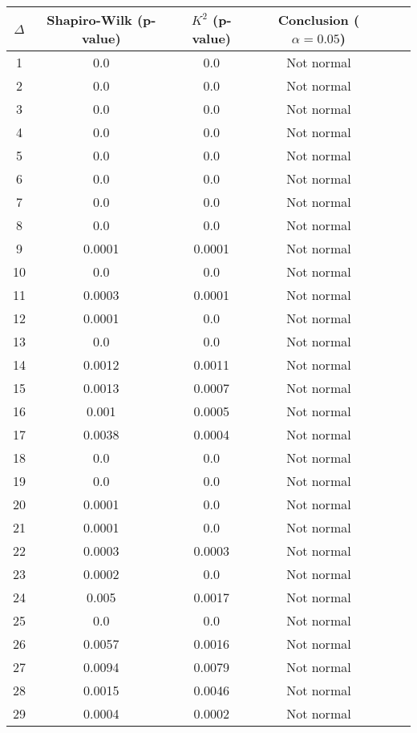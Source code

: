 \begin{table}[h]
	\begin{tabular}{|c|c|c|c|c|c|}
		\hline
		$\Delta$ & Shapiro-Wilk (p-value) & $K^2$ (p-value) & Conclusion ($\alpha = 0.05$)\\\hline
		\hline
		1 & 0.0 & 0.0 & Not normal\\\hline
		2 & 0.0 & 0.0 & Not normal\\\hline
		3 & 0.0 & 0.0 & Not normal\\\hline
		4 & 0.0 & 0.0 & Not normal\\\hline
		5 & 0.0 & 0.0 & Not normal\\\hline
		6 & 0.0 & 0.0 & Not normal\\\hline
		7 & 0.0 & 0.0 & Not normal\\\hline
		8 & 0.0 & 0.0 & Not normal\\\hline
		9 & 0.0001 & 0.0001 & Not normal\\\hline
		10 & 0.0 & 0.0 & Not normal\\\hline
		11 & 0.0003 & 0.0001 & Not normal\\\hline
		12 & 0.0001 & 0.0 & Not normal\\\hline
		13 & 0.0 & 0.0 & Not normal\\\hline
		14 & 0.0012 & 0.0011 & Not normal\\\hline
		15 & 0.0013 & 0.0007 & Not normal\\\hline
		16 & 0.001 & 0.0005 & Not normal\\\hline
		17 & 0.0038 & 0.0004 & Not normal\\\hline
		18 & 0.0 & 0.0 & Not normal\\\hline
		19 & 0.0 & 0.0 & Not normal\\\hline
		20 & 0.0001 & 0.0 & Not normal\\\hline
		21 & 0.0001 & 0.0 & Not normal\\\hline
		22 & 0.0003 & 0.0003 & Not normal\\\hline
		23 & 0.0002 & 0.0 & Not normal\\\hline
		24 & 0.005 & 0.0017 & Not normal\\\hline
		25 & 0.0 & 0.0 & Not normal\\\hline
		26 & 0.0057 & 0.0016 & Not normal\\\hline
		27 & 0.0094 & 0.0079 & Not normal\\\hline
		28 & 0.0015 & 0.0046 & Not normal\\\hline
		29 & 0.0004 & 0.0002 & Not normal\\\hline

\end{tabular}
\end{table}
